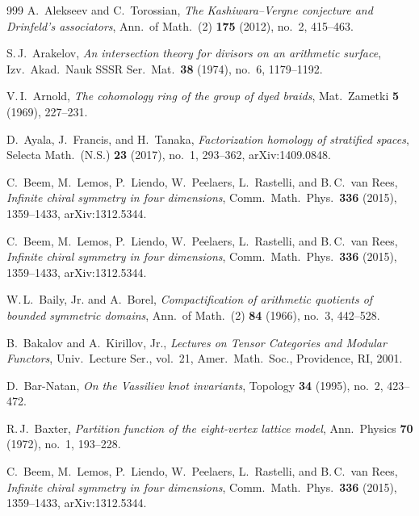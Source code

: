 \documentclass[11pt]{memoir}
\begin{document}
\begin{thebibliography}{999}
A.~Alekseev and C.~Torossian, \emph{The Kashiwara--Vergne conjecture and Drinfeld's associators}, Ann.\ of Math.\ (2) \textbf{175} (2012), no.~2, 415--463.

S.\,J.~Arakelov, \emph{An intersection theory for divisors on an arithmetic surface}, Izv.\ Akad.\ Nauk SSSR Ser.\ Mat.\ \textbf{38} (1974), no.~6, 1179--1192.

V.\,I.~Arnold, \emph{The cohomology ring of the group of dyed braids}, Mat.\ Zametki \textbf{5} (1969), 227--231.

D.~Ayala, J.~Francis, and H.~Tanaka, \emph{Factorization homology of stratified spaces}, Selecta Math.\ (N.S.) \textbf{23} (2017), no.~1, 293--362, arXiv:1409.0848.

C.~Beem, M.~Lemos, P.~Liendo, W.~Peelaers, L.~Rastelli, and B.\,C.~van Rees, \emph{Infinite chiral symmetry in four dimensions}, Comm.\ Math.\ Phys.\ \textbf{336} (2015), 1359--1433, arXiv:1312.5344.

C.~Beem, M.~Lemos, P.~Liendo, W.~Peelaers, L.~Rastelli, and B.\,C.~van Rees, \emph{Infinite chiral symmetry in four dimensions}, Comm.\ Math.\ Phys.\ \textbf{336} (2015), 1359--1433, arXiv:1312.5344.

W.\,L.~Baily, Jr. and A.~Borel, \emph{Compactification of arithmetic quotients of bounded symmetric domains}, Ann.\ of Math.\ (2) \textbf{84} (1966), no.~3, 442--528.

B.~Bakalov and A.~Kirillov, Jr., \emph{Lectures on Tensor Categories and Modular Functors}, Univ.\ Lecture Ser., vol.~21, Amer.\ Math.\ Soc., Providence, RI, 2001.

D.~Bar-Natan, \emph{On the Vassiliev knot invariants}, Topology \textbf{34} (1995), no.~2, 423--472.

R.\,J.~Baxter, \emph{Partition function of the eight-vertex lattice model}, Ann.\ Physics \textbf{70} (1972), no.~1, 193--228.

C.~Beem, M.~Lemos, P.~Liendo, W.~Peelaers, L.~Rastelli, and B.\,C.~van Rees, \emph{Infinite chiral symmetry in four dimensions}, Comm.\ Math.\ Phys.\ \textbf{336} (2015), 1359--1433, arXiv:1312.5344.


\end{thebibliography}
\end{document}
